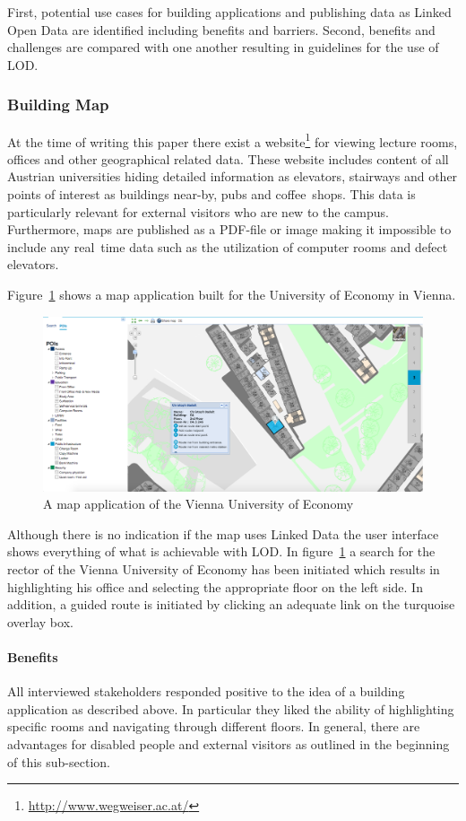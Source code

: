 \documentclass{article}
\begin{document}
First, potential use cases for building applications and publishing data as Linked Open Data are identified including benefits and barriers. Second, benefits and challenges are compared with one another resulting in guidelines for the use of LOD. 

\subsubsection{Building Map}
At the time of writing this paper there exist a website\footnote{\url{http://www.wegweiser.ac.at/}} for viewing lecture rooms, offices and other geographical related data. These website includes content of all Austrian universities hiding detailed information as elevators, stairways and other points of interest as buildings near-by, pubs and coffee~shops. 
This data is particularly relevant for external visitors who are new to the campus. Furthermore, maps are published as a PDF-file or image making it impossible to include any real~time data such as the utilization of computer rooms and defect elevators.

Figure~\ref{fig:um-map-app} shows a map application built for the University of Economy in Vienna. 
\begin{figure}[H]
	\centering \includegraphics*[width=.8\columnwidth]{map_wu_wien.png}
	\caption{A map application of the Vienna University of Economy}
	\label{fig:um-map-app}
\end{figure}
Although there is no indication if the map uses Linked Data the user interface shows everything of what is achievable with LOD. 
In figure~\ref{fig:um-map-app} a search for the rector of the Vienna University of Economy has been initiated which results in highlighting his office and selecting the appropriate floor on the left side. In addition, a guided route is initiated by clicking an adequate link on the turquoise overlay box. 
\paragraph{Benefits}
All interviewed stakeholders responded positive to the idea of a building application as described above. In particular they liked the ability of highlighting specific rooms and navigating through different floors. In general, there are advantages for disabled people and external visitors as outlined in the beginning of this sub-section. 
\end{document}

